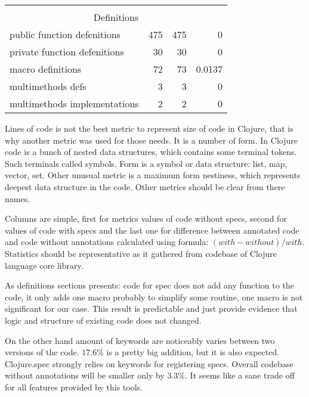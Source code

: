\begin{table}[]
\begin{tabular}{lrrr}
                                                   & \multicolumn{1}{l}{}         & \multicolumn{1}{l}{}       & \multicolumn{1}{l}{}          \\
\multicolumn{4}{c}{Definitions}                                                                                                                \\ \hline
\multicolumn{1}{|l|}{public function defenitions}  & \multicolumn{1}{r|}{475}     & \multicolumn{1}{r|}{475}   & \multicolumn{1}{r|}{0}        \\ \hline
\multicolumn{1}{|l|}{private function defenitions} & \multicolumn{1}{r|}{30}      & \multicolumn{1}{r|}{30}    & \multicolumn{1}{r|}{0}        \\ \hline
\multicolumn{1}{|l|}{macro definitions}            & \multicolumn{1}{r|}{72}      & \multicolumn{1}{r|}{73}    & \multicolumn{1}{r|}{0.0137}   \\ \hline
\multicolumn{1}{|l|}{multimethods defs}            & \multicolumn{1}{r|}{3}       & \multicolumn{1}{r|}{3}     & \multicolumn{1}{r|}{0}        \\ \hline
\multicolumn{1}{|l|}{multimethods implementations} & \multicolumn{1}{r|}{2}       & \multicolumn{1}{r|}{2}     & \multicolumn{1}{r|}{0}        \\ \hline
\end{tabular}
\end{table}

Lines of code is not the best metric to represent size of code in Clojure,
that is why another metric was used for those needs. It is a number of form. In
Clojure code is a bunch of nested data structures, which contains some terminal
tokens. Such terminals called symbols. Form is a symbol or data structure: list,
map, vector, set. Other unusual metric is a maximum form nestiness, which
represents deepest data structure in the code. Other metrics should be clear
from there names.

Columns are simple, first for metrics values of code without specs, second for
values of code with specs and the last one for difference between annotated code
and code without annotations calculated using formula: $(with - without)/with$.
Statistics should be representative as it gathered from codebase of Clojure
language core library.

As definitions sections presents: code for spec does not add any function to the
code, it only adds one macro probably to simplify some routine, one macro is not
significant for our case. This result is predictable and just provide evidence
that logic and structure of existing code does not changed.

On the other hand amount of keywords are noticeably varies between two versions
of the code. $17.6\%$ is a pretty big addition, but it is also expected.
Clojure.spec strongly relies on keywords for registering specs. Overall codebase
without annotations will be smaller only by $3.3\%$. It seems like a sane trade
off for all features provided by this tools.
